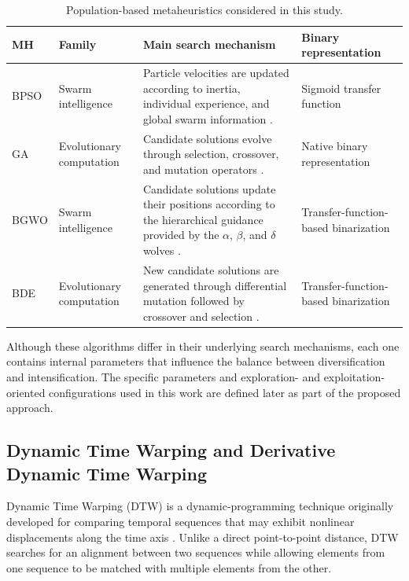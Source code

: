 \documentclass[journal,article,submit,moreauthors]{Definitions/mdpi}
\begin{document}
\begin{table}[htbp]
\centering
\caption{Population-based metaheuristics considered in this study.}
\label{tab:mhs}
\begin{tabular}{@{}p{1.6cm} p{2.2cm} p{5.1cm} p{2.7cm}@{}}
\toprule
\textbf{MH} & \textbf{Family} & \textbf{Main search mechanism} &
\textbf{Binary representation} \\
\midrule

BPSO &
Swarm intelligence &
Particle velocities are updated according to inertia, individual experience,
and global swarm information \cite{kennedy1997discrete}. &
Sigmoid transfer function \\

\midrule

GA &
Evolutionary computation &
Candidate solutions evolve through selection, crossover, and mutation
operators \cite{holland1975adaptation,goldberg1989genetic}. &
Native binary representation \\

\midrule

BGWO &
Swarm intelligence &
Candidate solutions update their positions according to the hierarchical
guidance provided by the $\alpha$, $\beta$, and $\delta$ wolves
\cite{mirjalili2014grey,emary2016binary}. &
Transfer-function-based binarization \\

\midrule

BDE &
Evolutionary computation &
New candidate solutions are generated through differential mutation followed
by crossover and selection \cite{storn1997differential,pampara2006binary}. &
Transfer-function-based binarization \\

\bottomrule
\end{tabular}
\end{table}

Although these algorithms differ in their underlying search mechanisms, each
one contains internal parameters that influence the balance between
diversification and intensification. The specific parameters and
exploration- and exploitation-oriented configurations used in this work are
defined later as part of the proposed approach.

\subsection{Dynamic Time Warping and Derivative Dynamic Time Warping}

Dynamic Time Warping (DTW) is a dynamic-programming technique originally
developed for comparing temporal sequences that may exhibit nonlinear
displacements along the time axis \cite{sakoe1978dynamic}. Unlike a direct
point-to-point distance, DTW searches for an alignment between two sequences
while allowing elements from one sequence to be matched with multiple
elements from the other.
\end{document}
